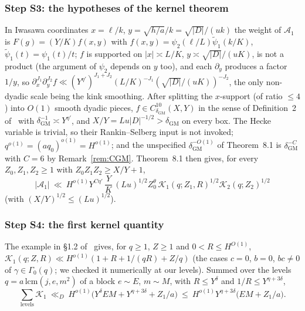 \documentclass[11pt,a4paper]{article}
\begin{document}
\subsubsection*{Step S3: the hypotheses of the kernel theorem}
In Iwasawa coordinates $x=\ell/k$, $y=\sqrt{h/a}/k=\sqrt{|D|}/(uk)$ the weight of $\mathcal A_1$ is $F(g)=(Y/K)f(x,y)$ with $f(x,y)=\psi_2(\ell/L)\tilde\psi_1(k/K)$,
$\tilde\psi_1(t)=\psi_1(t)/t$; $f$ is supported on $|x|\asymp L/K$, $y\asymp\sqrt{|D|}/(uK)$, is not a product (the argument of $\psi_2$ depends on $y$ too), and each $\partial_y$
produces a factor $1/y$, so $\partial_x^{J_1}\partial_y^{J_2}f\ll(Y^{\eta'})^{J_1+J_2}(L/K)^{-J_1}(\sqrt{|D|}/(uK))^{-J_2}$, the only non-dyadic scale being the kink smoothing. After
splitting the $x$-support (of ratio $\le4$) into $O(1)$ smooth dyadic pieces, $f\in C^{10}_{\delta_{\mathrm{GM}}}(X,Y)$ in the sense of Definition~2 of~\cite{GrimmeltMerikoski2025kernel}
with $\delta_{\mathrm{GM}}^{-1}\asymp Y^{\eta'}$, and $X/Y=Lu|D|^{-1/2}>\delta_{\mathrm{GM}}$ on every box. The Hecke variable is trivial, so their Rankin--Selberg input is not
invoked; $q^{o(1)}=(aq_0)^{o(1)}=H^{o(1)}$; and the unspecified $\delta_{\mathrm{GM}}^{-O(1)}$ of Theorem~8.1 is $\delta_{\mathrm{GM}}^{-C}$ with $C=6$ by Remark~\ref{rem:CGM}.
Theorem~8.1 then gives, for every $Z_0,Z_1,Z_2\ge1$ with $Z_0Z_1Z_2\ge X/Y+1$,
\begin{equation}\label{eq:GM}
|\mathcal A_1|\ \ll\ H^{o(1)}Y^{C\eta'}\,\frac YK\,(Lu)^{1/2}Z_0^{\theta}\,\mathcal K_1(q;Z_1,R)^{1/2}\mathcal K_2(q;Z_2)^{1/2}
\end{equation}
(with $(X/Y)^{1/2}\le(Lu)^{1/2}$).

\subsubsection*{Step S4: the first kernel quantity}
The example in \S1.2 of~\cite{GrimmeltMerikoski2025kernel} gives, for $q\ge1$, $Z\ge1$ and $0<R\le H^{O(1)}$, $\mathcal K_1(q;Z,R)\ll H^{o(1)}(1+R+1/(qR)+Z/q)$ (the cases
$c=0$, $b=0$, $bc\ne0$ of $\gamma\in\Gamma_0(q)$; we checked it numerically at our levels). Summed over the levels $q=a\,\mathrm{lcm}(j,e,m^2)$ of a block $e\sim E$, $m\sim M$, with
$R\le Y^{\delta}$ and $1/R\le Y^{\eta+3\delta}$,
\begin{equation}\label{eq:K1}
\sum_{\text{levels}}\mathcal K_1\ \ll_D\ H^{o(1)}\bigl(Y^{\delta}EM+Y^{\eta+3\delta}+Z_1/a\bigr)\ \le\ H^{o(1)}Y^{\eta+3\delta}\bigl(EM+Z_1/a\bigr).
\end{equation}
\end{document}
